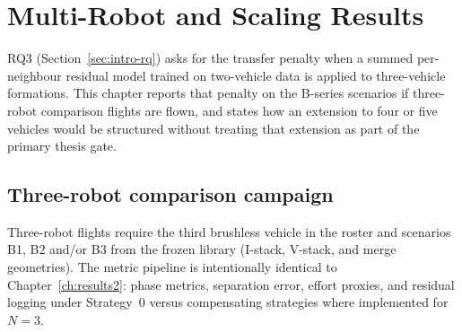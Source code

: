 %
%
%

\chapter{Multi-Robot and Scaling Results}
\label{ch:results3}

RQ3 (Section~\ref{sec:intro-rq}) asks for the transfer penalty when a summed per-neighbour
residual model trained on two-vehicle data is applied to three-vehicle formations. This chapter
reports that penalty on the B-series scenarios if three-robot comparison flights are flown, and
states how an extension to four or five vehicles would be structured without treating that extension
as part of the primary thesis gate.

\section{Three-robot comparison campaign}
\label{sec:res3-campaign}

Three-robot flights require the third brushless vehicle in the roster and scenarios B1, B2 and/or
B3 from the frozen library (I-stack, V-stack, and merge geometries). The metric pipeline is
intentionally identical to Chapter~\ref{ch:results2}: phase metrics, separation error, effort
proxies, and residual logging under Strategy~0 versus compensating strategies where implemented
for $N=3$.


